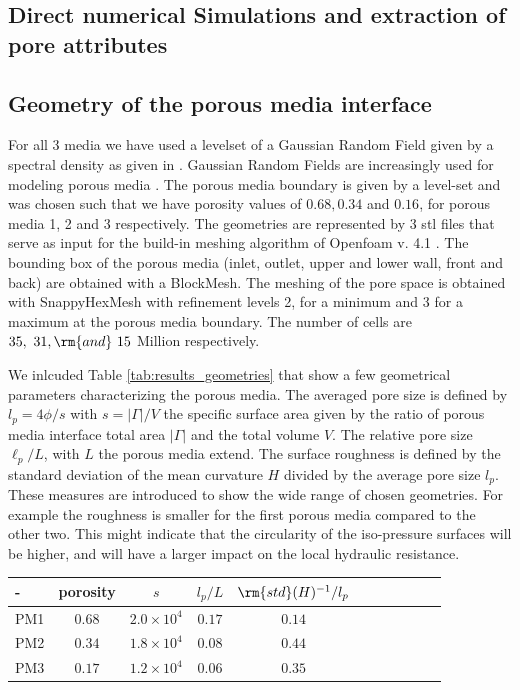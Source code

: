 \documentclass[draft,jgrga]{agutexSI2019}
\begin{document}
\begin{article}
\section{Direct numerical Simulations and extraction of pore attributes}

\subsection{Geometry of the porous media interface}
For all 3 media we have used a levelset of a Gaussian Random Field given by a spectral density as given in \cite{roberts_transport_1995}. Gaussian Random Fields are increasingly used for modeling porous media \cite{liu_advances_2019}. The porous media boundary is given by a level-set and was chosen such that we have porosity values of $0.68,0.34$ and $0.16$, for porous media 1, 2 and 3 respectively. The geometries are represented by 3 stl files that serve as input for the build-in meshing algorithm of Openfoam v. 4.1 . The bounding box of the porous media (inlet, outlet, upper and lower wall, front and back) are obtained with a BlockMesh. The meshing of the pore space is obtained with SnappyHexMesh with refinement levels 2, for a minimum and 3 for a maximum at the porous media boundary. The number of cells are $35,~ 31,\rm{and }~15$ Million respectively.

We inlcuded Table \ref{tab:results_geometries} that show a few geometrical parameters characterizing the porous media. The averaged pore size is defined by $l_p = 4 \phi/s$ with $s= |\Gamma|/V$ the specific surface area given by the ratio of porous media interface total area $|\Gamma|$ and the total volume $V$. The relative pore size $\ell_p/L$, with $L$ the porous media extend.  The surface roughness is defined by the standard deviation of the mean curvature $H$ divided by the average pore size $l_p$. These measures are introduced to show the wide range of chosen geometries. For example the roughness is smaller for the first porous media compared to the other two. This might indicate that the circularity of the iso-pressure surfaces will be higher, and will have a larger impact on the local hydraulic resistance.  

\vspace{1cm}
\begin{tabular}{l|c|c|c|c|c|c|c|c|c|c}\label{tab:results_geometries}
- & porosity & $s$ & $ l_p/L$ &  $\rm{std}(H)^{-1}/l_p$ \\
\hline
PM1 &$0.68$ & $2.0\times10^{4}$ & $0.17$ &  $0.14$ \\
PM2 & $0.34$ & $1.8\times10^{4}$ & $0.08$ &  $0.44$ \\
PM3 & $0.17$ & $1.2\times10^{4}$ & $0.06$ &  $0.35$ 
\end{tabular}


\end{article}
\end{document}
